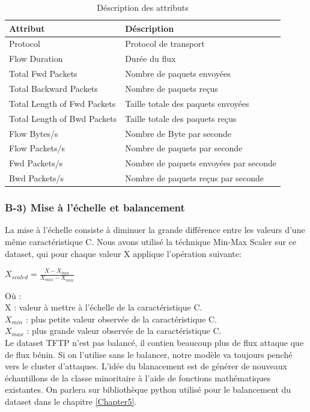 \begin{table}[h]
\begin{center}
\begin{tabular}{ | m{4cm} | m{10cm} | }
\hline
\rowcolor[rgb]{0.85,0.85,0.85}
\textbf{Attribut} & \textbf{Déscription}\\
\hline
Protocol & Protocol de transport\\
\hline
Flow Duration & Durée du flux\\
\hline
Total Fwd Packets & Nombre de paquets envoyées \\
\hline
Total Backward Packets &  Nombre de paquets reçus \\
\hline
Total Length of Fwd Packets & Taille totale des paquets envoyées \\
\hline
Total Length of Bwd Packets & Taille totale des paquets reçus \\
\hline
Flow Bytes/s &  Nombre de Byte par seconde\\ 
\hline
Flow Packets/s &  Nombre de paquets par seconde\\
\hline
Fwd Packets/s & Nombre de paquets envoyées par seconde \\
\hline
Bwd Packets/s & Nombre de paquets reçus par seconde \\
\hline
\end{tabular}
\caption{Déscription des attributs}
\label{table:attributs}
\end{center}
\end{table}

\subsubsection{B-3) Mise à l'échelle et balancement}
La mise à l'échelle consiste à diminuer la grande différence entre les valeurs d'une même caractéristique C. Nous avons utilisé la téchnique Min-Max Scaler sur ce dataset, qui pour chaque valeur X applique l'opération suivante:
\begin{center}
{\large $ X_{scaled} = \frac{X - X_{min}}{X_{max} - X_{min}} $}
\end{center}
Où :\\
X : valeur à mettre à l'échelle de la caractéristique C.\\
$X_{min}$ : plus petite valeur observée de la caractéristique C. \\
$X_{max}$ : plus grande valeur observée de la caractéristique C.\\

Le dataset TFTP n'est pas balancé, il contien beaucoup plus de flux attaque que de flux bénin. Si on l'utilise sans le balancer, notre modèle va toujours penché vers le cluster d'attaques. L'idée du blanacement est de générer de nouveaux échantillons de la classe minoritaire à l'aide de fonctions mathématiques existantes. On parlera sur bibliothèque python utilisé pour le balancement du dataset dans le chapitre \ref{Chapter5}.

